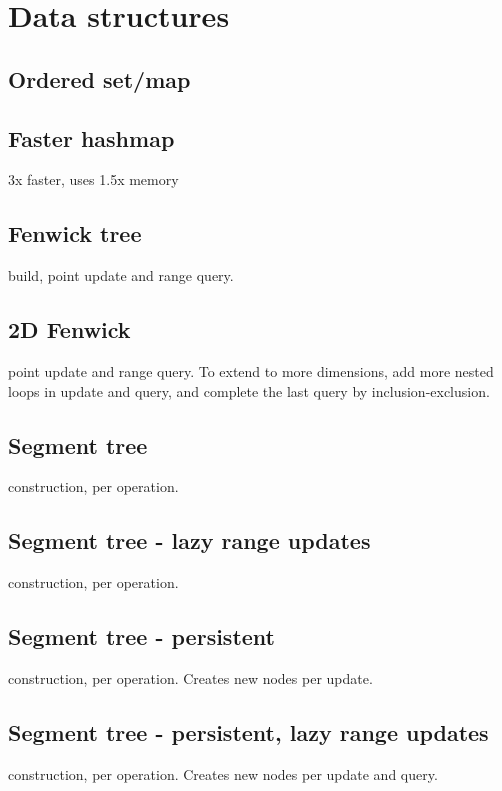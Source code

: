 \section{Data structures}

\subsection{Ordered set/map}

\subsection{Faster hashmap}
3x faster, uses 1.5x memory

\subsection{Fenwick tree}
 build,  point update and range query.

\subsection{2D Fenwick}
 point update and range query.
To extend to more dimensions, add more nested loops in update
and query, and complete the last query by inclusion-exclusion.

\subsection{Segment tree}
 construction,  per operation.

\subsection{Segment tree - lazy range updates}
 construction,  per operation.

\subsection{Segment tree - persistent}
 construction,  per operation.
Creates  new nodes per update.

\subsection{Segment tree - persistent, lazy range updates}
 construction,  per operation.
Creates  new nodes per update and query.

